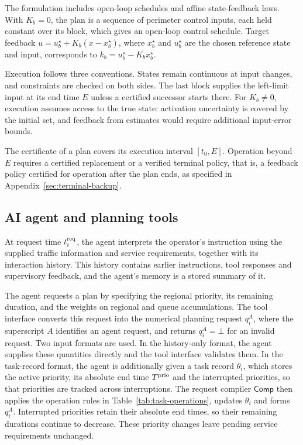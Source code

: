 \documentclass[final]{cas-sc}
\theoremstyle{definition}
\theoremstyle{plain}
\theoremstyle{definition}
\theoremstyle{plain}
\newcommand{\appref}[1]{Appendix~\ref{#1}}
\begin{document}
The formulation includes open-loop schedules and affine
state-feedback laws. With $K_b=0$, the plan is a sequence of
perimeter control inputs, each held constant over its block, which
gives an open-loop control schedule. Target feedback
$u=u_b^\star+K_b(x-x_b^\star)$, where $x_b^\star$ and $u_b^\star$ are
the chosen reference state and input, corresponds to
$k_b=u_b^\star-K_bx_b^\star$.

Execution follows three conventions. States remain continuous at
input changes, and constraints are checked on both sides. The last
block supplies the left-limit input at its end time $E$ unless a
certified successor starts there. For $K_b\ne0$, execution assumes
access to the true state: activation uncertainty is covered by the
initial set, and feedback from estimates would require additional
input-error bounds.

The certificate of a plan covers its execution interval $[t_0,E]$.
Operation beyond $E$ requires a certified replacement or a verified
terminal policy, that is, a feedback policy certified for operation
after the plan ends, as specified in \appref{sec:terminal-backup}.

\subsection{AI agent and planning tools}
\label{sec:agent-requests}

At request time $t_i^{\rm req}$, the agent interprets the operator's
instruction using the supplied traffic information and service
requirements, together with its interaction history. This history
contains earlier instructions, tool responses and supervisory
feedback, and the agent's memory is a stored summary of it.

The agent requests a plan by specifying the regional priority, its
remaining duration, and the weights on regional and queue
accumulations. The tool interface converts this request into the
numerical planning request $q_i^{A}$, where the superscript $A$
identifies an agent request, and returns $q_i^{A}=\bot$ for an invalid
request. Two input formats are used. In the history-only format, the
agent supplies these quantities directly and the tool interface
validates them. In the task-record format, the agent is additionally
given a task record $\theta_i$, which stores the active priority, its
absolute end time $T^{\rm prio}$ and the interrupted priorities, so
that priorities are tracked across interruptions. The request
compiler $\mathsf{Comp}$ then applies the operation rules in
Table~\ref{tab:task-operations}, updates $\theta_i$ and forms $q_i^{A}$.
Interrupted priorities retain their absolute end times, so their
remaining durations continue to decrease. These priority changes
leave pending service requirements unchanged.
\end{document}
